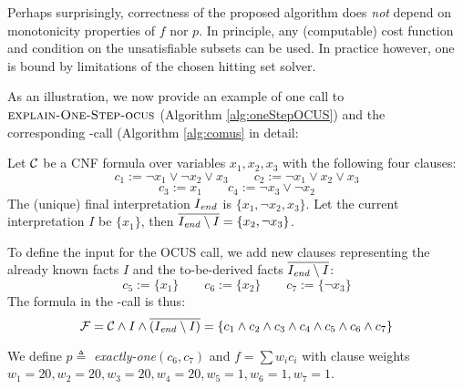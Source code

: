 Perhaps surprisingly, correctness of the proposed algorithm does \emph{not} depend on monotonicity properties of $f$ nor $p$. In principle, any (computable) cost function and condition on the unsatisfiable subsets can be used. In practice however, one is bound by limitations of the chosen hitting set solver.

As an illustration, we now provide an example of one call to $\textsc{explain-One-Step-ocus}$ (Algorithm 
\ref{alg:oneStepOCUS}) and the corresponding \comus-call (Algorithm \ref{alg:comus} in detail: 
\begin{example}
	Let $\mathcal{C} $ be a CNF formula over variables $x_1, x_2, x_3$ with the following four clauses:
		\[ c_1 := \lnot x_1 \vee \lnot x_2 \vee x_3 \qquad  c_2 := \lnot x_1 \vee  x_2 \vee x_3\] \[  c_3 := x_1 \qquad c_4 := \lnot x_3 \vee \lnot x_2 \]
	 The (unique) final interpretation $I_\mathit{end} $ is $\{x_1, \lnot x_2,  x_3\}$. Let the current interpretation $I$ be $\{ x_1\}$, then $\overline{I_\mathit{end} \setminus I} =  \{x_2, \lnot x_3\}$.
	 
	 To define the input for the OCUS call, we add new clauses representing the already known facts $I$ and the to-be-derived facts $\overline{I_\mathit{end} \setminus I}$: 
	 \[ c_5 := \{x_1\}\qquad  c_6:=\{x_2\} \qquad  c_7 := \{\lnot x_3\}\]
	 The formula \formula in the \comus-call is thus: 
	 \[\mathcal{F} = \mathcal{C} \land I \land \overline{(I_\mathit{end} \setminus I)} = \{ c_1 \wedge c_2 \wedge c_3\wedge c_4\wedge c_5\wedge c_6\wedge c_7\}\]	
	 	 
	 We define $p\triangleq$ \textit{exactly-one$(c_6, c_7)$} and $f = \sum w_ic_i$ with clause weights $w_1 = 20, w_2=20, w_3=20, w_4=20, w_5=1, w_6=1, w_7=1$.
	 

\end{example}
